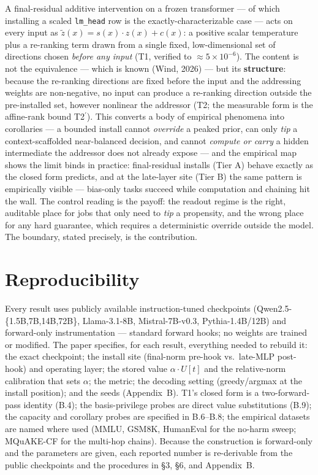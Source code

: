 \documentclass[11pt]{article}
\theoremstyle{plain}
\theoremstyle{definition}
\begin{document}
A final-residual additive intervention on a frozen transformer --- of which installing a scaled \texttt{lm\_head} row is the exactly-characterizable case --- acts on every input as $\tilde z(x) = s(x)\cdot z(x) + c(x)$: a positive scalar temperature plus a re-ranking term drawn from a single fixed, low-dimensional set of directions chosen \emph{before any input} (T1, verified to $\approx 5\times10^{-6}$). The content is not the equivalence --- which is known (Wind, 2026) --- but its \textbf{structure}: because the re-ranking directions are fixed before the input and the addressing weights are non-negative, no input can produce a re-ranking direction outside the pre-installed set, however nonlinear the addressor (T2; the measurable form is the affine-rank bound T2$^{\prime}$). This converts a body of empirical phenomena into corollaries --- a bounded install cannot \emph{override} a peaked prior, can only \emph{tip} a context-scaffolded near-balanced decision, and cannot \emph{compute or carry} a hidden intermediate the addressor does not already expose --- and the empirical map shows the limit binds in practice: final-residual installs (Tier A) behave exactly as the closed form predicts, and at the late-layer site (Tier B) the same pattern is empirically visible --- bias-only tasks succeed while computation and chaining hit the wall. The control reading is the payoff: the readout regime is the right, auditable place for jobs that only need to \emph{tip} a propensity, and the wrong place for any hard guarantee, which requires a deterministic override outside the model. The boundary, stated precisely, is the contribution.

\section*{Reproducibility}

Every result uses publicly available instruction-tuned checkpoints (Qwen2.5-\{1.5B,7B,14B,72B\}, Llama-3.1-8B, Mistral-7B-v0.3, Pythia-1.4B/12B) and forward-only instrumentation --- standard forward hooks; no weights are trained or modified. The paper specifies, for each result, everything needed to rebuild it: the exact checkpoint; the install site (final-norm pre-hook vs.\ late-MLP post-hook) and operating layer; the stored value $\alpha\cdot U[t]$ and the relative-norm calibration that sets $\alpha$; the metric; the decoding setting (greedy/argmax at the install position); and the seeds (Appendix~B). T1's closed form is a two-forward-pass identity (B.4); the basis-privilege probes are direct value substitutions (B.9); the capacity and corollary probes are specified in B.6--B.8; the empirical datasets are named where used (MMLU, GSM8K, HumanEval for the no-harm sweep; MQuAKE-CF for the multi-hop chains). Because the construction is forward-only and the parameters are given, each reported number is re-derivable from the public checkpoints and the procedures in \S 3, \S 6, and Appendix~B.
\end{document}
